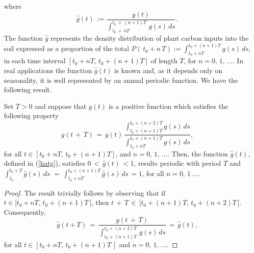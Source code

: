 \noindent where
\begin{equation}\label{hatg}
    \hat g(t)\,:= \displaystyle \frac{g(t)}{\displaystyle \int_{t_0\,+\,nT}^{t_0\,+\,(n+1)T} \, g(s) \, ds}.\, 
\end{equation}
The function $\hat g$ represents the density distribution of plant carbon inputs into the soil expressed as a proportion of the  total $P(\,t_0+n\,T):= \displaystyle \int_{t_0+nT}^{t_0+(n+1)T} g(s) \, ds$,  in each time interval $[t_0+nT,\, t_0+(n+1)T]$ of length $T$, for $n=0,\, 1,\, \dots$. 
In real applications  the function $\hat g(t)$ is known and, as it depends only on  seasonality, it is  well represented by an annual periodic function.
We have the following result.
\begin{theorem}\label{thm:hatg}
Set $T>0$ and suppose that $g(t)$ is a positive function which satisfies the following property
$$
g(t\,+\, T)\, =\, g(t)\,  \displaystyle \frac{\displaystyle \int_{t_0+(n+1)T}^{t_0+(n+2)T}g(s)\, ds}{\displaystyle \int_{t_0+nT}^{t_0+(n+1)T}g(s)\, ds},
$$
for all $t\in [t_0+nT,\, t_0+(n+1)T]$, and $n=0,\,1,\,\dots.$
Then, the function $\hat g(t)$, defined in (\ref{hatg}), satisfies $0\,<\, \hat g(t)\, < 1$, results  periodic with period $T$ and $\displaystyle \int_{t_0}^{t_0+T}\hat g(s)\, ds\,\,=\,\displaystyle \int_{t_0+nT}^{t_0+(n+1)T}\hat g(s)\, ds\,=1$,  for all  $n=0,\,1\,\dots$.
\end{theorem}

\begin{proof}
The result trivially follows by observing that if  $t\in  [t_0+nT,\, t_0+(n+1)T\,[$, then $t\,+\, T\, \in \,  [t_0+(n+1)T,\, t_0+(n+2)T\, [$. Consequently,
$$
\hat g(t+T)\, =\, \displaystyle \frac{g(t\,+\, T)}{\displaystyle \int_{t_0+(n+1)T}^{t_0+(n+2)T} \, g(s) \, ds}\, = \, \hat g(t), 
$$
for all $t\in [t_0+nT,\, t_0+(n+1)T\, ]$ and $ n=0,\,1,\,\dots.$
\end{proof}



